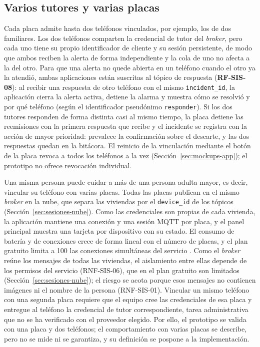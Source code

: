 \documentclass[12pt,a4paper,oneside]{book}
\theoremstyle{plain}
\theoremstyle{definition}
\theoremstyle{remark}
\begin{document}
\subsection{Varios tutores y varias placas}
\label{sec:multi-tutor}

Cada placa admite hasta dos teléfonos vinculados, por ejemplo, los de dos familiares. Los dos teléfonos comparten la credencial de tutor del \textit{broker}, pero cada uno tiene su propio identificador de cliente y su sesión persistente, de modo que ambos reciben la alerta de forma independiente y la cola de uno no afecta a la del otro. Para que una alerta no quede abierta en un teléfono cuando el otro ya la atendió, ambas aplicaciones están suscritas al tópico de respuesta (\textbf{RF-SIS-08}): al recibir una respuesta de otro teléfono con el mismo \texttt{incident\_id}, la aplicación cierra la alerta activa, detiene la alarma y muestra cómo se resolvió y por qué teléfono (según el identificador pseudónimo \texttt{responder}). Si los dos tutores responden de forma distinta casi al mismo tiempo, la placa detiene las reemisiones con la primera respuesta que recibe y el incidente se registra con la acción de mayor prioridad: prevalece la confirmación sobre el descarte, y las dos respuestas quedan en la bitácora. El reinicio de la vinculación mediante el botón de la placa revoca a todos los teléfonos a la vez (Sección~\ref{sec:mockups-app}); el prototipo no ofrece revocación individual.

Una misma persona puede cuidar a más de una persona adulta mayor, es decir, vincular su teléfono con varias placas. Todas las placas publican en el mismo \textit{broker} en la nube, que separa las viviendas por el \texttt{device\_id} de los tópicos (Sección~\ref{sec:sesiones-nube}). Como las credenciales son propias de cada vivienda, la aplicación mantiene una conexión y una sesión MQTT por placa, y el panel principal muestra una tarjeta por dispositivo con su estado. El consumo de batería y de conexiones crece de forma lineal con el número de placas, y el plan gratuito limita a 100 las conexiones simultáneas del servicio \parencite{hivemq2026planes}. Como el \textit{broker} reúne los mensajes de todas las viviendas, el aislamiento entre ellas depende de los permisos del servicio (RNF-SIS-06), que en el plan gratuito son limitados (Sección~\ref{sec:sesiones-nube}); el riesgo se acota porque esos mensajes no contienen imágenes ni el nombre de la persona (RNF-SIS-01). Vincular un mismo teléfono con una segunda placa requiere que el equipo cree las credenciales de esa placa y entregue al teléfono la credencial de tutor correspondiente, tarea administrativa que no se ha verificado con el proveedor elegido. Por ello, el prototipo se valida con una placa y dos teléfonos; el comportamiento con varias placas se describe, pero no se mide ni se garantiza, y su definición se pospone a la implementación.
\end{document}

